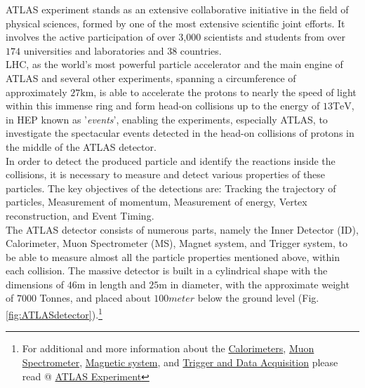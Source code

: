 ATLAS experiment stands as an extensive collaborative initiative in the field of physical sciences, formed by one of the most extensive scientific joint efforts. It involves the active participation of over 3,000 scientists and students from over $174$ universities and laboratories and $38$ countries.\\
LHC, as the world's most powerful particle accelerator and the main engine of ATLAS and several other experiments, spanning a circumference of approximately $27 \si{\kilo\meter}$, is able to accelerate the protons to nearly the speed of light within this immense ring and form head-on collisions up to the energy of $13 \si{\tera\eV}$, in HEP known as '\textit{events}', enabling the experiments, especially ATLAS, to investigate the spectacular events detected in the head-on collisions of protons in the middle of the ATLAS detector.\cite{Barnett_2011}\\

In order to detect the produced particle and identify the reactions inside the collisions, it is necessary to measure and detect various properties of these particles. The key objectives of the detections are: Tracking the trajectory of particles, Measurement of momentum, Measurement of energy, Vertex reconstruction, and Event Timing.\\

The ATLAS detector consists of numerous parts, namely the Inner Detector (ID), Calorimeter, Muon Spectrometer (MS), Magnet system, and Trigger system, to be able to measure almost all the particle properties mentioned above, within each collision. The massive detector is built in a cylindrical shape with the dimensions of $46 \si{\meter}$ in length and $25\si{\meter}$ in diameter, with the approximate weight of $7000$ Tonnes, and placed about $100 \si{meter}$ below the ground level (Fig.\ref{fig:ATLASdetector}).\footnote{For additional and  more information about the \href{https://atlas.cern/Discover/Detector/Calorimeter}{Calorimeters}, \href{https://atlas.cern/Discover/Detector/Muon-Spectrometer}{Muon Spectrometer}, \href{https://atlas.cern/Discover/Detector/Magnet-System}{Magnetic system}, and \href{https://atlas.cern/Discover/Detector/Trigger-DAQ}{Trigger and Data Acquisition} please read @ \href{https://atlas.cern/}{ATLAS Experiment} }


